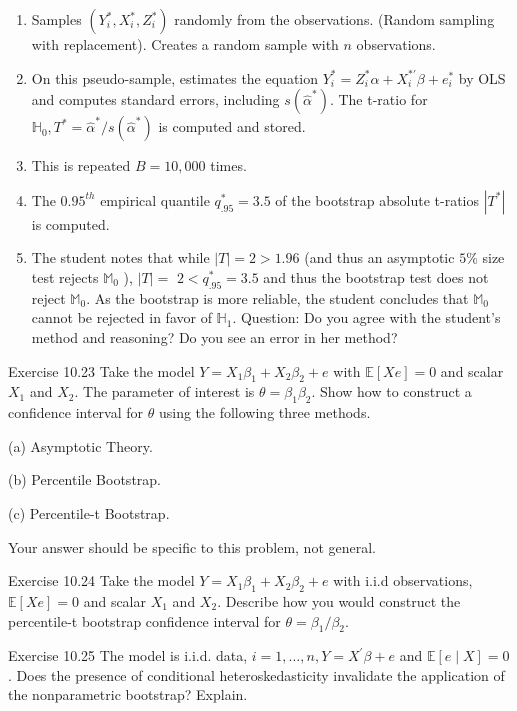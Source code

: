 \documentclass[10pt]{article}
\begin{document}
\begin{enumerate}
  \item Samples $\left(Y_{i}^{*}, X_{i}^{*}, Z_{i}^{*}\right)$ randomly from the observations. (Random sampling with replacement). Creates a random sample with $n$ observations.

  \item On this pseudo-sample, estimates the equation $Y_{i}^{*}=Z_{i}^{*} \alpha+X_{i}^{* \prime} \beta+e_{i}^{*}$ by OLS and computes standard errors, including $s\left(\widehat{\alpha}^{*}\right)$. The t-ratio for $\mathbb{H}_{0}, T^{*}=\widehat{\alpha}^{*} / s\left(\widehat{\alpha}^{*}\right)$ is computed and stored.

  \item This is repeated $B=10,000$ times.

  \item The $0.95^{t h}$ empirical quantile $q_{.95}^{*}=3.5$ of the bootstrap absolute t-ratios $\left|T^{*}\right|$ is computed.

  \item The student notes that while $|T|=2>1.96$ (and thus an asymptotic $5 \%$ size test rejects $\mathbb{M}_{0}$ ), $|T|=$ $2<q_{.95}^{*}=3.5$ and thus the bootstrap test does not reject $\mathbb{M}_{0}$. As the bootstrap is more reliable, the student concludes that $\mathbb{M}_{0}$ cannot be rejected in favor of $\mathbb{H}_{1}$. Question: Do you agree with the student's method and reasoning? Do you see an error in her method?

\end{enumerate}
Exercise 10.23 Take the model $Y=X_{1} \beta_{1}+X_{2} \beta_{2}+e$ with $\mathbb{E}[X e]=0$ and scalar $X_{1}$ and $X_{2}$. The parameter of interest is $\theta=\beta_{1} \beta_{2}$. Show how to construct a confidence interval for $\theta$ using the following three methods.

(a) Asymptotic Theory.

(b) Percentile Bootstrap.

(c) Percentile-t Bootstrap.

Your answer should be specific to this problem, not general.

Exercise 10.24 Take the model $Y=X_{1} \beta_{1}+X_{2} \beta_{2}+e$ with i.i.d observations, $\mathbb{E}[X e]=0$ and scalar $X_{1}$ and $X_{2}$. Describe how you would construct the percentile-t bootstrap confidence interval for $\theta=\beta_{1} / \beta_{2}$.

Exercise 10.25 The model is i.i.d. data, $i=1, \ldots, n, Y=X^{\prime} \beta+e$ and $\mathbb{E}[e \mid X]=0$. Does the presence of conditional heteroskedasticity invalidate the application of the nonparametric bootstrap? Explain.
\end{document}
